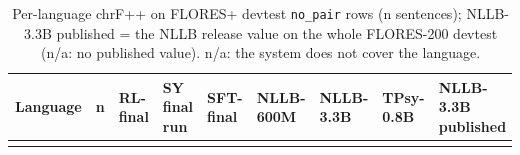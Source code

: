 {\scriptsize\setlength{\tabcolsep}{3pt}
\begin{longtable}[]{@{}
  >{\raggedright\arraybackslash}p{}
  >{\raggedleft\arraybackslash}p{}
  >{\raggedleft\arraybackslash}p{}
  >{\raggedleft\arraybackslash}p{}
  >{\raggedleft\arraybackslash}p{}
  >{\raggedleft\arraybackslash}p{}
  >{\raggedleft\arraybackslash}p{}
  >{\raggedleft\arraybackslash}p{}
  >{\raggedleft\arraybackslash}p{}@{}}
\caption{Per-language chrF++ on FLORES+ devtest \protect\texttt{no\_pair} rows (n sentences); NLLB-3.3B published = the NLLB release value on the whole FLORES-200 devtest (n/a: no published value). n/a: the system does not cover the language.}\label{tab:t_cmp_perlang_chrf}\tabularnewline
\toprule\noalign{}
\begin{minipage}[b]{\linewidth}\raggedright
Language
\end{minipage} & \begin{minipage}[b]{\linewidth}\raggedleft
n
\end{minipage} & \begin{minipage}[b]{\linewidth}\raggedleft
RL-final
\end{minipage} & \begin{minipage}[b]{\linewidth}\raggedleft
SY final run
\end{minipage} & \begin{minipage}[b]{\linewidth}\raggedleft
SFT-final
\end{minipage} & \begin{minipage}[b]{\linewidth}\raggedleft
NLLB-600M
\end{minipage} & \begin{minipage}[b]{\linewidth}\raggedleft
NLLB-3.3B
\end{minipage} & \begin{minipage}[b]{\linewidth}\raggedleft
TPsy-0.8B
\end{minipage} & \begin{minipage}[b]{\linewidth}\raggedleft
NLLB-3.3B published
\end{minipage} \\
\midrule\noalign{}
\endfirsthead
\toprule\noalign{}
\begin{minipage}[b]{\linewidth}\raggedright

\end{minipage}
\end{longtable}}
